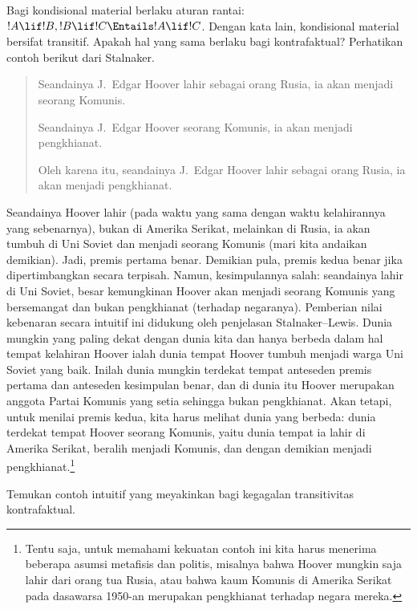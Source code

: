 \documentclass[../../../include/open-logic-section]{subfiles}
\begin{document}


Bagi kondisional material berlaku aturan rantai: $!A \lif !B, !B \lif !C
\Entails !A \lif !C$. Dengan kata lain, kondisional material bersifat
transitif. Apakah hal yang sama berlaku bagi kontrafaktual? Perhatikan contoh
berikut dari Stalnaker.
\begin{quote}
  Seandainya J.~Edgar Hoover lahir sebagai orang Rusia, ia akan menjadi
  seorang Komunis.

  Seandainya J.~Edgar Hoover seorang Komunis, ia akan menjadi pengkhianat.

  Oleh karena itu, seandainya J.~Edgar Hoover lahir sebagai orang Rusia, ia
  akan menjadi pengkhianat.
\end{quote}
Seandainya Hoover lahir (pada waktu yang sama dengan waktu kelahirannya yang
sebenarnya), bukan di Amerika Serikat, melainkan di Rusia, ia akan tumbuh di
Uni Soviet dan menjadi seorang Komunis (mari kita andaikan demikian). Jadi,
premis pertama benar. Demikian pula, premis kedua benar jika dipertimbangkan
secara terpisah. Namun, kesimpulannya salah: seandainya lahir di Uni Soviet,
besar kemungkinan Hoover akan menjadi seorang Komunis yang bersemangat dan
bukan pengkhianat (terhadap negaranya). Pemberian nilai kebenaran secara
intuitif ini didukung oleh penjelasan Stalnaker--Lewis. Dunia mungkin yang
paling dekat dengan dunia kita dan hanya berbeda dalam hal tempat kelahiran
Hoover ialah dunia tempat Hoover tumbuh menjadi warga Uni Soviet yang baik.
Inilah dunia mungkin terdekat tempat anteseden premis pertama dan anteseden
kesimpulan benar, dan di dunia itu Hoover merupakan anggota Partai Komunis
yang setia sehingga bukan pengkhianat. Akan tetapi, untuk menilai premis
kedua, kita harus melihat dunia yang berbeda: dunia terdekat tempat Hoover
seorang Komunis, yaitu dunia tempat ia lahir di Amerika Serikat, beralih
menjadi Komunis, dan dengan demikian menjadi pengkhianat.\footnote{Tentu saja,
  untuk memahami kekuatan contoh ini kita harus menerima beberapa asumsi
  metafisis dan politis, misalnya bahwa Hoover mungkin saja lahir dari orang
  tua Rusia, atau bahwa kaum Komunis di Amerika Serikat pada dasawarsa 1950-an
  merupakan pengkhianat terhadap negara mereka.}

\begin{prob}
  Temukan contoh intuitif yang meyakinkan bagi kegagalan transitivitas
  kontrafaktual.
\end{prob}
\end{document}
